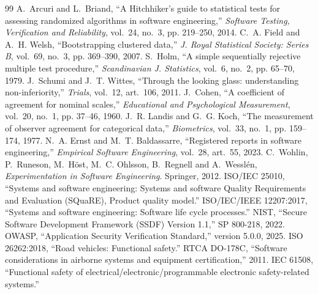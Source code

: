 \documentclass[conference]{IEEEtran}
\begin{document}
\begin{thebibliography}{99}
 A.~Arcuri and L.~Briand, ``A Hitchhiker's guide to statistical tests for assessing randomized algorithms in software engineering,'' \emph{Software Testing, Verification and Reliability}, vol.~24, no.~3, pp. 219--250, 2014.
 C.~A. Field and A.~H. Welsh, ``Bootstrapping clustered data,'' \emph{J. Royal Statistical Society: Series B}, vol.~69, no.~3, pp. 369--390, 2007.
 S.~Holm, ``A simple sequentially rejective multiple test procedure,'' \emph{Scandinavian J. Statistics}, vol.~6, no.~2, pp. 65--70, 1979.
 J.~Schumi and J.~T. Wittes, ``Through the looking glass: understanding non-inferiority,'' \emph{Trials}, vol.~12, art.~106, 2011.
 J.~Cohen, ``A coefficient of agreement for nominal scales,'' \emph{Educational and Psychological Measurement}, vol.~20, no.~1, pp. 37--46, 1960.
 J.~R. Landis and G.~G. Koch, ``The measurement of observer agreement for categorical data,'' \emph{Biometrics}, vol.~33, no.~1, pp. 159--174, 1977.
 N.~A. Ernst and M.~T. Baldassarre, ``Registered reports in software engineering,'' \emph{Empirical Software Engineering}, vol.~28, art.~55, 2023.
 C.~Wohlin, P.~Runeson, M.~H{\"o}st, M.~C. Ohlsson, B.~Regnell and A.~Wessl{\'e}n, \emph{Experimentation in Software Engineering}. Springer, 2012.
 ISO/IEC 25010, ``Systems and software engineering: Systems and software Quality Requirements and Evaluation (SQuaRE), Product quality model.'' %
 ISO/IEC/IEEE 12207:2017, ``Systems and software engineering: Software life cycle processes.'' %
 NIST, ``Secure Software Development Framework (SSDF) Version 1.1,'' SP 800-218, 2022. %
 OWASP, ``Application Security Verification Standard,'' version 5.0.0, 2025. %
 ISO 26262:2018, ``Road vehicles: Functional safety.'' %
 RTCA DO-178C, ``Software considerations in airborne systems and equipment certification,'' 2011. %
 IEC 61508, ``Functional safety of electrical/electronic/programmable electronic safety-related systems.'' %
\end{thebibliography}
\end{document}

